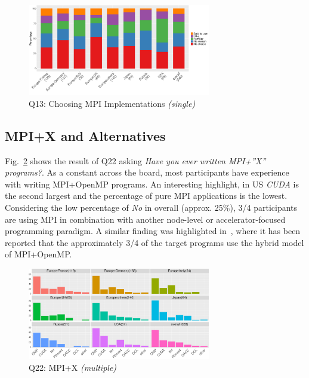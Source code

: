 \documentclass[preprint,5p,times]{elsarticle}
\def\myquote#1{{\it #1}}
\newcommand{\revision}[2]{{\color{blue}#2}}
\begin{document}

  \begin{figure}[tb]
    \begin{center}
      \includegraphics[width=8.0cm]{R-scripts/Q13.pdf}
      \vspace{-1.5mm}
      \caption{Q13: Choosing MPI Implementations {\it(single)}}
      \label{fig:choosing-implementation}
\vspace{-3mm}%
    \end{center}
  \end{figure}

\subsection{MPI+X and Alternatives}

Fig.~\ref{fig:mpi-x} shows the result of Q22 asking \myquote{Have you ever
written MPI+''X'' programs?}. As a constant across the board, most participants
have \revision{experienced}{experience with} writing MPI+OpenMP programs. An interesting highlight, in US
\myquote{CUDA} is the second largest and the percentage of pure MPI applications is
the lowest. Considering the low percentage of \myquote{No} in overall (approx.
25\%), 3/4 participants are using MPI in combination with another node-level or
accelerator-focused programming paradigm. A similar finding was highlighted
in~\cite{10.1145/3295500.3356176}, where it has been reported that the
approximately 3/4 of the target programs use the hybrid model of MPI+OpenMP.

\begin{figure}[tb]
\begin{center}
\includegraphics[width=8.0cm]{R-scripts/Q22.pdf}
\vspace{-1.5mm}
\caption{Q22: MPI+X {\it(multiple)}}
\label{fig:mpi-x}
\vspace{-3mm}%
\end{center}
\end{figure}
\end{document}
